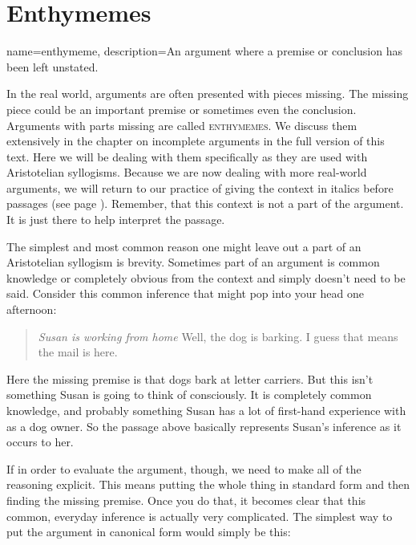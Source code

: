 {\begin{exercises}
  
\end{exercises}



\section{Enthymemes}
\label{sec:enthymemes}
{
name=enthymeme,
description={An argument where a premise or conclusion has been left unstated.}
}


In the real world, arguments are often presented with pieces missing. The missing piece could be an important premise or sometimes even the conclusion.  Arguments with parts missing are called \textsc{\glspl{enthymeme}}. \label{def:enthymeme} We discuss them extensively in the chapter on incomplete arguments in the full version of this text. \label{ver_var}  Here we will be dealing with them specifically as they are used with Aristotelian syllogisms. Because we are now dealing with more real-world arguments, we will return to our practice of giving the context in italics before passages (see page \pageref{context_marker}). Remember, that this context is not a part of the argument. It is just there to help interpret the passage. 

The simplest and most common reason one might leave out a part of an Aristotelian syllogism is brevity. Sometimes part of an argument is common knowledge or completely obvious from the context and simply doesn't need to be said. Consider this common inference that might pop into your head one afternoon:

\begin{quotation} \noindent \textit{Susan is working from home} Well, the dog is barking. I guess that means the mail is here.\end{quotation}

Here the missing premise is that dogs bark at letter carriers. But this isn't something Susan is going to think of consciously. It is completely common knowledge, and probably something Susan has a lot of first-hand experience with as a dog owner. So the passage above basically represents Susan's inference as it occurs to her. 

If in order to evaluate the argument, though, we need to make all of the reasoning explicit. This means putting the whole thing in standard form and then finding the missing premise. Once you do that, it becomes clear that this common, everyday inference is actually very complicated. The simplest way to put the argument in canonical form would simply be this:

}
